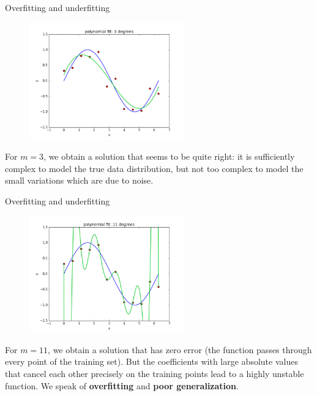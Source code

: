 \documentclass[xcolor=pdftex,dvipsnames,table]{beamer}
\begin{document}
\begin{frame}{Overfitting and underfitting}
\begin{figure}[htb]
\includegraphics[width=0.6\textwidth]{../graphics/polyfit_degree_3.png}
\end{figure}
For $m=3$, we obtain a solution that seems to be quite right: it is sufficiently complex to model the true data distribution, but not too complex to model the small variations which are due to noise.
\end{frame}

\begin{frame}{Overfitting and underfitting}
\begin{figure}[htb]
\includegraphics[width=0.6\textwidth]{../graphics/polyfit_degree_11.png}
\end{figure}
For $m=11$, we obtain a solution that has zero error (the function passes through every point of the training set). But the coefficients with large absolute values that cancel each other precisely on the training points lead to a highly unstable function. We speak of \textbf{overfitting} and \textbf{poor generalization}.
\end{frame}
\end{document}
